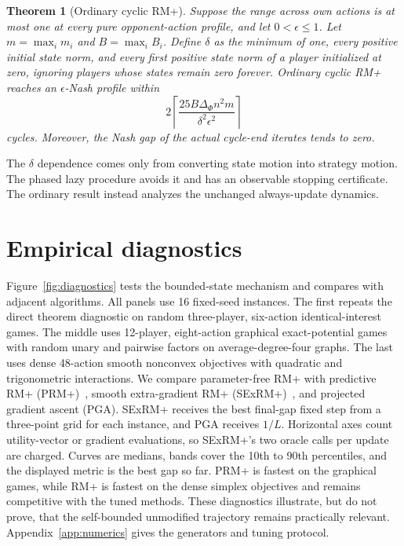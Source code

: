 \documentclass{article}
\newtheorem{theorem}{Theorem}
\begin{document}
\begin{theorem}[Ordinary cyclic RM+]
\label{thm:nonlazy}
Suppose the range across own actions is at most one at every pure opponent-action profile, and let $0<\epsilon\le1$. Let $m=\max_i m_i$ and $B=\max_iB_i$. Define $\delta$ as the minimum of one, every positive initial state norm, and every first positive state norm of a player initialized at zero, ignoring players whose states remain zero forever. Ordinary cyclic RM+ reaches an $\epsilon$-Nash profile within
\begin{equation}
2\left\lceil\frac{25B\Delta_\Phi n^2m}{\delta^2\epsilon^2}\right\rceil
\label{eq:nonlazy}
\end{equation}
cycles. Moreover, the Nash gap of the actual cycle-end iterates tends to zero.
\end{theorem}

The $\delta$ dependence comes only from converting state motion into strategy motion. The phased lazy procedure avoids it and has an observable stopping certificate. The ordinary result instead analyzes the unchanged always-update dynamics.

\section{Empirical diagnostics}
\label{sec:experiments}

Figure~\ref{fig:diagnostics} tests the bounded-state mechanism and compares with adjacent algorithms. All panels use 16 fixed-seed instances. The first repeats the direct theorem diagnostic on random three-player, six-action identical-interest games. The middle uses 12-player, eight-action graphical exact-potential games with random unary and pairwise factors on average-degree-four graphs. The last uses dense 48-action smooth nonconvex objectives with quadratic and trigonometric interactions. We compare parameter-free RM+ with predictive RM+ (PRM+)~\citep{Farina21:Faster}, smooth extra-gradient RM+ (SExRM+)~\citep{Farina23:Regret}, and projected gradient ascent (PGA). SExRM+ receives the best final-gap fixed step from a three-point grid for each instance, and PGA receives $1/L$. Horizontal axes count utility-vector or gradient evaluations, so SExRM+'s two oracle calls per update are charged. Curves are medians, bands cover the 10th to 90th percentiles, and the displayed metric is the best gap so far. PRM+ is fastest on the graphical games, while RM+ is fastest on the dense simplex objectives and remains competitive with the tuned methods. These diagnostics illustrate, but do not prove, that the self-bounded unmodified trajectory remains practically relevant. Appendix~\ref{app:numerics} gives the generators and tuning protocol.
\end{document}
